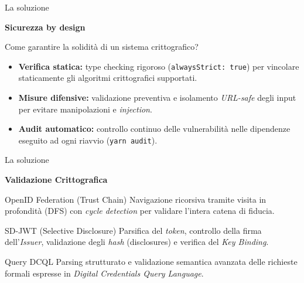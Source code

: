 \documentclass{beamer}
\begin{document}
	\begin{frame}{La soluzione}
		\vfill
		{\centering \huge{\textbf{\textcolor{rossoPantano}{Sicurezza by design}}} \par}
		\vspace{0.5em}
		Come garantire la solidità di un sistema crittografico? \vspace{.5em}
		\begin{itemize}
			\item \textbf{Verifica statica:} type checking rigoroso (\texttt{alwaysStrict: true}) per vincolare staticamente gli algoritmi crittografici supportati. \vspace{.5em}
			\item \textbf{Misure difensive:} validazione preventiva e isolamento \textit{URL-safe} degli input per evitare manipolazioni e \textit{injection}. \vspace{.5em}
			\item \textbf{Audit automatico:} controllo continuo delle vulnerabilità nelle dipendenze eseguito ad ogni riavvio (\texttt{yarn audit}).
		\end{itemize}
		\vfill
	\end{frame}

	\begin{frame}{La soluzione}
		\vfill
		{\centering \huge{\textbf{\textcolor{rossoPantano}{Validazione Crittografica}}} \par}
		\vspace{0.5em}
		\begin{block}{OpenID Federation (Trust Chain)}
			Navigazione ricorsiva tramite visita in profondità (DFS) con \textit{cycle detection} per validare l'intera catena di fiducia.
		\end{block}

		\begin{alertblock}{SD-JWT (Selective Disclosure)}
			Parsifica del \textit{token}, controllo della firma dell'\textit{Issuer}, validazione degli \textit{hash} (disclosures) e verifica del \textit{Key Binding}.
		\end{alertblock}

		\begin{exampleblock}{Query DCQL}
			Parsing strutturato e validazione semantica avanzata delle richieste formali espresse in \textit{Digital Credentials Query Language}.
		\end{exampleblock}
		\vfill
	\end{frame}
\end{document}
